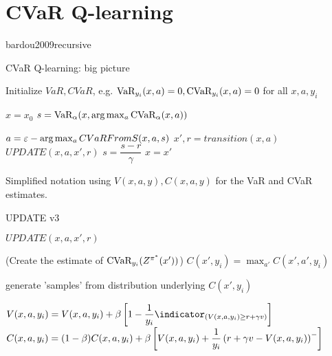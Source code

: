\section{CVaR Q-learning}\label{sec:qcvar}

bardou2009recursive

\begin{algorithm}[h!]
\caption{CVaR Q-learning: big picture}
\begin{algorithmic}
    \STATE Initialize $VaR, CVaR$, e.g. $\text{VaR}_{y_i}(x, a)=0, \text{CVaR}_{y_i}(x, a)=0$ for all $x, a, y_i$
    
	
	\STATE $x = x_0$
	\STATE $s = \text{VaR}_\alpha(x, \text{arg}\max_a \text{CVaR}_\alpha(x, a))$
	
	\STATE $a = \varepsilon-\text{arg}\max_a CVaRFromS(x, a, s)$
	\STATE $x', r = transition(x, a)$
	\STATE $UPDATE(x, a, x', r)$
	\STATE $s = \dfrac{s-r}{\gamma}$
	\STATE $x = x'$
	\ENDWHILE
	
	\ENDWHILE
\end{algorithmic}
\end{algorithm}

Simplified notation using $V(x, a, y), C(x, a, y)$ for the VaR and CVaR estimates.

\begin{algorithm}[h!]
\caption{UPDATE v3}
\begin{algorithmic}

    \STATE $UPDATE(x, a, x', r)$
    
    (Create the estimate of $\text{CVaR}_{y_i}(Z^{\pi^*}(x'))$)
	\STATE $C(x', y_i) = \max_{a'} C(x', a', y_i)$
	\ENDFOR
	
	\STATE generate 'samples' from distribution underlying $C(x', y_i)$
	
	\STATE $V(x, a, y_i) = V(x, a, y_i) + \beta \bsquare{1 - \dfrac{1}{y_i}\indicator_{(V(x, a, y_i) \ge r+\gamma v)}}$
	\STATE $C(x, a, y_i) = (1-\beta)C(x, a, y_i) + \beta \left[ {V(x, a, y_i) + \dfrac{1}{y_i}\left( {r+\gamma v - V(x, a, y_i)} \right)^-} \right]$
	\ENDFOR
	
\end{algorithmic}
\end{algorithm}





